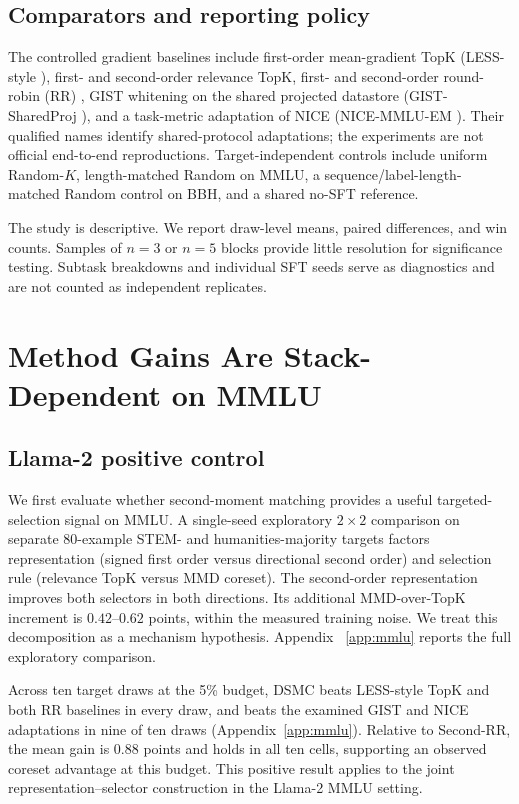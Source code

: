 \documentclass{article}
\newcommand{\method}{\textsc{DSMC}}
\begin{document}
\subsection{Comparators and reporting policy}

The controlled gradient baselines include first-order mean-gradient TopK
(LESS-style \citep{xia2024less}), first- and second-order relevance TopK,
first- and second-order round-robin (RR) \citep{nayak2026critical}, GIST
whitening on the shared projected datastore
(GIST-SharedProj \citep{min2026gist}), and a task-metric adaptation of NICE
(NICE-MMLU-EM \citep{wang2025nice}). Their qualified names identify
shared-protocol adaptations; the experiments are not official end-to-end
reproductions.
Target-independent controls include uniform Random-$K$, length-matched Random
on MMLU, a sequence/label-length-matched Random control on BBH, and a shared
no-SFT reference.

The study is descriptive. We report draw-level means, paired differences, and
win counts. Samples of $n=3$ or $n=5$ blocks provide little resolution for
significance testing. Subtask breakdowns and individual SFT seeds serve as
diagnostics and are not counted as independent replicates.

\section{Method Gains Are Stack-Dependent on MMLU}
\label{sec:mmlu}

\subsection{Llama-2 positive control}

We first evaluate whether second-moment matching provides a useful
targeted-selection signal on MMLU. A single-seed exploratory $2\times2$
comparison on separate 80-example STEM- and humanities-majority targets
factors representation (signed first order versus directional second order)
and selection rule (relevance TopK versus MMD coreset). The second-order
representation improves both selectors in both directions. Its additional
MMD-over-TopK increment is $0.42$--$0.62$ points, within the measured training
noise. We treat this decomposition as a mechanism hypothesis. Appendix
~\ref{app:mmlu} reports the full exploratory comparison.

Across ten target draws at the 5\% budget,
\method{} beats LESS-style TopK and both RR baselines in every draw, and beats
the examined GIST and NICE adaptations in nine of ten draws
(Appendix~\ref{app:mmlu}). Relative to Second-RR, the mean gain is $0.88$
points and holds in all ten cells, supporting an observed coreset advantage at
this budget. This positive result applies to the joint representation--selector
construction in the Llama-2 MMLU setting.
\end{document}
